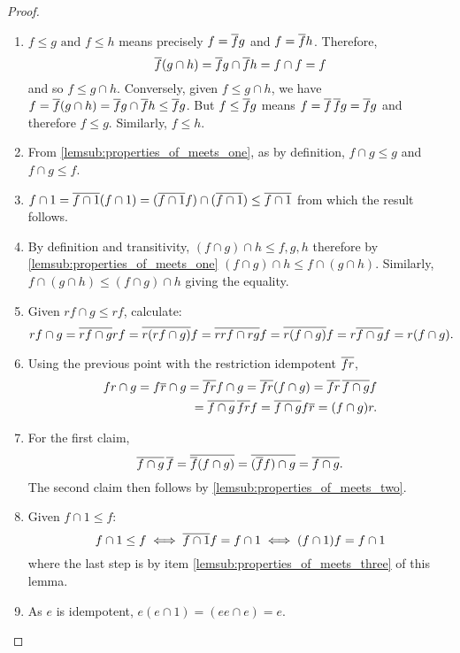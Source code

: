 \begin{proof}
  \prepprooflist
  \begin{enumerate}[{(}i{)}]
    \item $f\le g \text{ and } f \le h$ means precisely $f = \overline{f} g$ and $f = \overline{f} h$.
      Therefore,
      \[
        \overline{f} (g\cap h) =  \overline{f} g \cap \overline{f} h =  f\cap f = f
      \]
      and so $f \le g \cap h$. Conversely, given $f \le g\cap h$, we have
      $f = \overline{f} (g\cap h) = \overline{f} g \cap \overline{f} h \le \overline{f} g $. But
      $f \le \overline{f} g$ means $f = \overline{f}\,\overline{f} g = \overline{f}g$ and therefore
      $f \le g$. Similarly, $f \le h$.
    \item From \ref{lemsub:properties_of_meets_one}, as by definition, $f\cap g \le g$ and
      $f \cap g \le f$.
    \item $f\cap 1 = \overline{f\cap 1} (f \cap 1)= (\overline{f \cap 1} f ) \cap (\overline{f \cap 1})
      \le \overline{f \cap 1}$ from which the result follows. %
    \item By definition and transitivity, $(f\cap g)\cap h \le f, g, h$ therefore by
      \ref{lemsub:properties_of_meets_one} $(f \cap g) \cap h \le f \cap (g \cap h)$. Similarly,
      $f \cap (g \cap h) \le(f \cap g) \cap h$ giving the equality.
    \item Given  $r f \cap g \le r f$, calculate:
      \[
        r f\cap g
        = \overline{r f\cap g} r f
        = \overline{r (r f\cap g)} f
        = \overline{r r f\cap r g} f
        = \overline{r (f\cap g)} f
        = r \overline{f\cap g} f
        = r (f\cap g).
      \]
    \item Using the previous point with the restriction idempotent $\overline{f r}$,
      \begin{equation*}
        \begin{split}
          f r \cap g
          = f \restr{r} \cap g   %
          = \restr{f r }f \cap g  %
          = \restr{f r}(f\cap g)   %
          = \restr{f r}\, \restr{f\cap g} f \\ %
          = \restr{f\cap g}\, \restr{f r} f %
          = \restr{f\cap g} f \restr{r}  %
          = (f\cap g) r. %
        \end{split}
      \end{equation*}
    \item For the first claim,
      \[
        \overline{f\cap g}\, \overline{f} =\overline{\overline{f}(f\cap g)}\\
        =\overline{(\overline{f}f)\cap g} =\overline{f\cap g}.
      \]
      The second claim then follows by \ref{lemsub:properties_of_meets_two}.
    \item Given $ f \cap 1 \leq f$:
      \[
        f \cap 1 \leq f \iff  \overline{f \cap 1} f = f \cap 1 \iff  (f \cap 1) f = f \cap 1
      \]
      where the last step is by item \ref{lemsub:properties_of_meets_three} of this lemma.
    \item As $e$ is idempotent, $e (e\cap 1) = (e e \cap e) = e$.
  \end{enumerate}
\end{proof}
